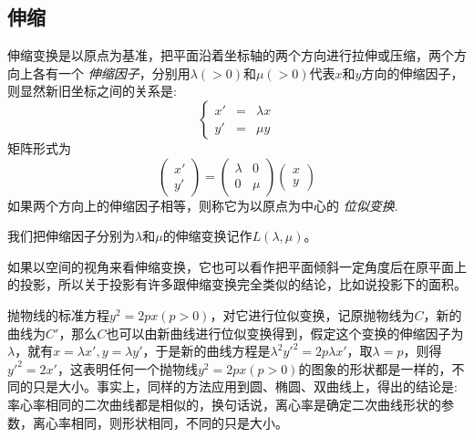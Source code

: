 \subsection{伸缩}

伸缩变换是以原点为基准，把平面沿着坐标轴的两个方向进行拉伸或压缩，两个方向上各有一个 \emph{伸缩因子}，分别用$\lambda(>0)$和$\mu(>0)$代表$x$和$y$方向的伸缩因子，则显然新旧坐标之间的关系是:
\begin{equation}
  \label{eq:scale-translation-coordinate-formula-1}
  \left\{
    \begin{array}{ccc}
      x' & = & \lambda x \\
      y' & = & \mu y
    \end{array}
  \right.
\end{equation}
矩阵形式为
\begin{equation*}
  \left(
    \begin{array}{c}
      x' \\
      y'
    \end{array}
  \right)
    =
    \left(
      \begin{array}{cc}
        \lambda & 0 \\
        0 & \mu
      \end{array}
    \right)
  \left(
    \begin{array}{c}
      x \\
      y
    \end{array}
  \right)
\end{equation*}
如果两个方向上的伸缩因子相等，则称它为以原点为中心的 \emph{位似变换}.

我们把伸缩因子分别为$\lambda$和$\mu$的伸缩变换记作$L(\lambda, \mu)$。

如果以空间的视角来看伸缩变换，它也可以看作把平面倾斜一定角度后在原平面上的投影，所以关于投影有许多跟伸缩变换完全类似的结论，比如说投影下的面积。

\begin{example}[二次曲线的离心率决定其形状]
  抛物线的标准方程$y^2=2px(p>0)$，对它进行位似变换，记原抛物线为$C$，新的曲线为$C'$，那么$C$也可以由新曲线进行位似变换得到，假定这个变换的伸缩因子为$\lambda$，就有$x=\lambda x', y=\lambda y'$，于是新的曲线方程是$\lambda^2y'^2=2p\lambda x'$，取$\lambda = p$，则得$y'^2=2x'$，这表明任何一个抛物线$y^2=2px(p>0)$的图象的形状都是一样的，不同的只是大小。事实上，同样的方法应用到圆、椭圆、双曲线上，得出的结论是: 率心率相同的二次曲线都是相似的，换句话说，离心率是确定二次曲线形状的参数，离心率相同，则形状相同，不同的只是大小。
\end{example}

